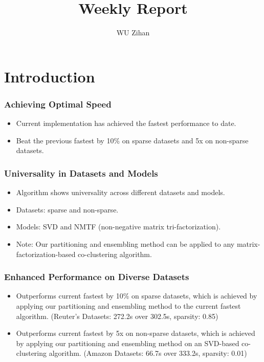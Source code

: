\documentclass{beamer}
\title{Weekly Report}
\author{WU Zihan}
\begin{document}
\maketitle

\section{Introduction}

\begin{frame}
    \frametitle{Achieving Optimal Speed}
    \begin{itemize}
        \item Current implementation has achieved the fastest performance to date. 
        \item Beat the previous fastest by 10\% on sparse datasets and 5x on non-sparse datasets.
    \end{itemize}
\end{frame}

\begin{frame}
    \frametitle{Universality in Datasets and Models}
    \begin{itemize}
        \item Algorithm shows universality across different datasets and models.
        \item Datasets: sparse and non-sparse.
        \item Models: SVD and NMTF (non-negative matrix tri-factorization).
        \item Note: Our partitioning and ensembling method can be applied to any matrix-factorization-based co-clustering algorithm.
    \end{itemize}
\end{frame}

\begin{frame}
    \frametitle{Enhanced Performance on Diverse Datasets}
    \begin{itemize}
        \item Outperforms current fastest by 10\% on sparse datasets, which is achieved by applying our partitioning and ensembling method to the current fastest algorithm.
        (Reuter's Datasets: 272.2s over 302.5s, sparsity: 0.85)
        \item Outperforms current fastest by 5x on non-sparse datasets, which is achieved by applying our partitioning and ensembling method on an SVD-based co-clustering algorithm.
        (Amazon Datasets: 66.7s over 333.2s, sparsity: 0.01)
    \end{itemize}
\end{frame}

\end{document}
